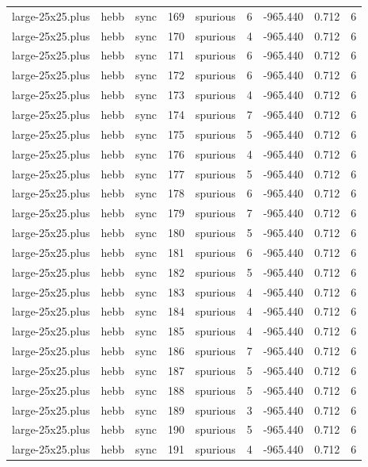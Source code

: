 \begin{tabular}{lllrlrrrr}
large-25x25.plus & hebb & sync & 169 & spurious & 6 & -965.440 & 0.712 & 6 \\
large-25x25.plus & hebb & sync & 170 & spurious & 4 & -965.440 & 0.712 & 6 \\
large-25x25.plus & hebb & sync & 171 & spurious & 6 & -965.440 & 0.712 & 6 \\
large-25x25.plus & hebb & sync & 172 & spurious & 6 & -965.440 & 0.712 & 6 \\
large-25x25.plus & hebb & sync & 173 & spurious & 4 & -965.440 & 0.712 & 6 \\
large-25x25.plus & hebb & sync & 174 & spurious & 7 & -965.440 & 0.712 & 6 \\
large-25x25.plus & hebb & sync & 175 & spurious & 5 & -965.440 & 0.712 & 6 \\
large-25x25.plus & hebb & sync & 176 & spurious & 4 & -965.440 & 0.712 & 6 \\
large-25x25.plus & hebb & sync & 177 & spurious & 5 & -965.440 & 0.712 & 6 \\
large-25x25.plus & hebb & sync & 178 & spurious & 6 & -965.440 & 0.712 & 6 \\
large-25x25.plus & hebb & sync & 179 & spurious & 7 & -965.440 & 0.712 & 6 \\
large-25x25.plus & hebb & sync & 180 & spurious & 5 & -965.440 & 0.712 & 6 \\
large-25x25.plus & hebb & sync & 181 & spurious & 6 & -965.440 & 0.712 & 6 \\
large-25x25.plus & hebb & sync & 182 & spurious & 5 & -965.440 & 0.712 & 6 \\
large-25x25.plus & hebb & sync & 183 & spurious & 4 & -965.440 & 0.712 & 6 \\
large-25x25.plus & hebb & sync & 184 & spurious & 4 & -965.440 & 0.712 & 6 \\
large-25x25.plus & hebb & sync & 185 & spurious & 4 & -965.440 & 0.712 & 6 \\
large-25x25.plus & hebb & sync & 186 & spurious & 7 & -965.440 & 0.712 & 6 \\
large-25x25.plus & hebb & sync & 187 & spurious & 5 & -965.440 & 0.712 & 6 \\
large-25x25.plus & hebb & sync & 188 & spurious & 5 & -965.440 & 0.712 & 6 \\
large-25x25.plus & hebb & sync & 189 & spurious & 3 & -965.440 & 0.712 & 6 \\
large-25x25.plus & hebb & sync & 190 & spurious & 5 & -965.440 & 0.712 & 6 \\
large-25x25.plus & hebb & sync & 191 & spurious & 4 & -965.440 & 0.712 & 6 \\

\end{tabular}
